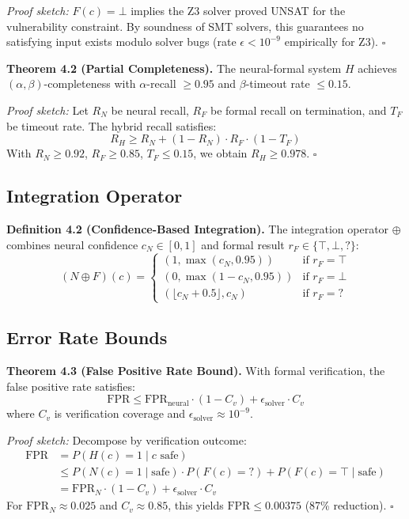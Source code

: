 \documentclass[10pt,journal,compsoc]{IEEEtran}
\begin{document}
\textit{Proof sketch:} $F(c) = \bot$ implies the Z3 solver proved UNSAT for the vulnerability constraint. By soundness of SMT solvers, this guarantees no satisfying input exists modulo solver bugs (rate $\epsilon < 10^{-9}$ empirically for Z3). \hfill $\square$

\textbf{Theorem 4.2 (Partial Completeness).}
The neural-formal system $H$ achieves $(\alpha, \beta)$-completeness with $\alpha$-recall $\geq 0.95$ and $\beta$-timeout rate $\leq 0.15$.

\textit{Proof sketch:} Let $R_N$ be neural recall, $R_F$ be formal recall on termination, and $T_F$ be timeout rate. The hybrid recall satisfies:
\begin{equation}
R_H \geq R_N + (1-R_N) \cdot R_F \cdot (1-T_F)
\end{equation}
With $R_N \geq 0.92$, $R_F \geq 0.85$, $T_F \leq 0.15$, we obtain $R_H \geq 0.978$. \hfill $\square$

\subsection{Integration Operator}

\textbf{Definition 4.2 (Confidence-Based Integration).}
The integration operator $\oplus$ combines neural confidence $c_N \in [0,1]$ and formal result $r_F \in \{\top, \bot, ?\}$:
\begin{equation}
(N \oplus F)(c) = \begin{cases}
(1, \max(c_N, 0.95)) & \text{if } r_F = \top \\
(0, \max(1-c_N, 0.95)) & \text{if } r_F = \bot \\
(\lfloor c_N + 0.5 \rfloor, c_N) & \text{if } r_F = ?
\end{cases}
\end{equation}

\subsection{Error Rate Bounds}

\textbf{Theorem 4.3 (False Positive Rate Bound).}
With formal verification, the false positive rate satisfies:
\begin{equation}
\text{FPR} \leq \text{FPR}_{\text{neural}} \cdot (1 - C_v) + \epsilon_{\text{solver}} \cdot C_v
\end{equation}
where $C_v$ is verification coverage and $\epsilon_{\text{solver}} \approx 10^{-9}$.

\textit{Proof sketch:} Decompose by verification outcome:
\begin{align}
\text{FPR} &= P(H(c)=1 \mid c \text{ safe}) \nonumber \\
&\leq P(N(c)=1 \mid \text{safe}) \cdot P(F(c)=?) + P(F(c)=\top \mid \text{safe}) \nonumber \\
&= \text{FPR}_N \cdot (1 - C_v) + \epsilon_{\text{solver}} \cdot C_v
\end{align}
For $\text{FPR}_N \approx 0.025$ and $C_v \approx 0.85$, this yields $\text{FPR} \leq 0.00375$ (87\% reduction). \hfill $\square$
\end{document}
